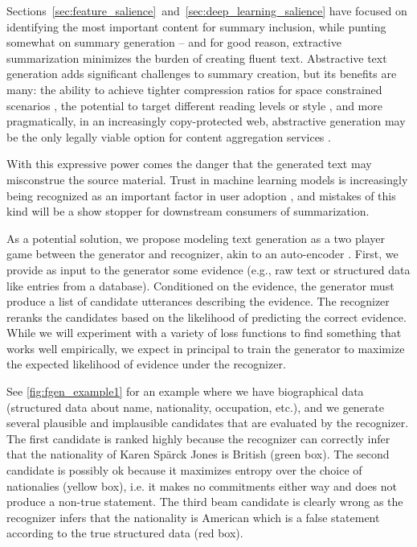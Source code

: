 Sections~\ref{sec:feature_salience}~and~\ref{sec:deep_learning_salience}
have focused on identifying the most important content for summary inclusion,
while punting somewhat on summary generation -- and for good reason, 
extractive summarization minimizes the burden of creating fluent text. 
Abstractive text generation adds significant challenges to summary creation, 
but its benefits are many: the ability to achieve tighter compression ratios
for space constrained scenarios \citep{fan2017controllable}, the potential
to target different reading levels \citep{margarido2008automatic}
or style \citep{shen2017style}, and more pragmatically, in
an increasingly copy-protected web, abstractive generation may be the only 
legally viable option for content aggregation services 
\citep{kassam2014google}.

With this expressive power comes the danger that the generated text may
misconstrue the source material. Trust in machine learning
models is increasingly being recognized as an important factor in user 
adoption \citep{ribeiro2016should}, and mistakes of this kind will be 
a show stopper for downstream consumers of summarization. 



As a potential solution,
we propose modeling text generation as a two player game between the generator
and recognizer, akin to an auto-encoder \citep{rumelhart1985learning}. 
First, we provide as input to the 
generator some evidence (e.g., raw text or structured data like entries 
from a database). Conditioned on the evidence, the generator must produce 
a list of candidate utterances describing the evidence. The recognizer
reranks the candidates based on the likelihood of predicting the 
correct evidence.
While we will experiment with a variety of loss functions to find something
that works well empirically, we expect in principal to train the generator
to maximize the expected likelihood of evidence under the recognizer.




See \autoref{fig:fgen_example1} for an example 
where we have biographical data (structured data about name, nationality, 
occupation, etc.), and we generate several plausible and implausible 
candidates that are evaluated by the recognizer.
The first candidate is 
 ranked highly because the recognizer can correctly infer that the 
 nationality of Karen Sp\"arck Jones is British (green box). The second 
 candidate is possibly ok because it maximizes entropy over the choice 
 of nationalies (yellow box), i.e. it makes no commitments either way and does
 not produce a non-true statement. The third beam candidate is clearly wrong
 as the recognizer infers that the nationality is American which is a false
 statement according to the true structured data (red box).

